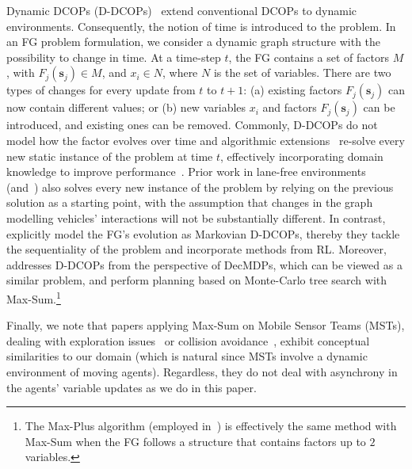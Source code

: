 Dynamic DCOPs (D-DCOPs)~\cite{dcopsurvey} extend conventional DCOPs to dynamic environments. 
Consequently, the notion of time is introduced to the problem. In an FG problem formulation, we consider a dynamic graph structure with the possibility to change in time. 
At a time-step $t$, the FG contains a set of factors $M$, with $F_j(\mathbf{s}_j) \in M$, and $x_i \in N$, where $N$ is the set of variables.
There are two types of changes for every update from $t$ to $t+1$: (a) existing factors $F_j(\mathbf{s}_j)$ can now contain different values; or (b) new variables $x_i$ and factors $F_j(\mathbf{s}_j)$ can be introduced, and existing ones can be removed.
Commonly, D-DCOPs do not model how the factor evolves over time and algorithmic extensions~\cite{dcopsurvey} re-solve every new static instance of the problem at time $t$, effectively incorporating domain knowledge to improve performance~\cite{Ramchurn2010}.
Prior work in lane-free environments~\cite{troullinos_ijcai} (and~\cite{stranders2009}) also solves every new instance of the problem by relying on the previous solution as a starting point, with the assumption that changes in the graph modelling vehicles' interactions will not be substantially different.
In contrast,~\cite{Nguyen_Yeoh_Lau_Zilberstein_Zhang_2014} explicitly model the FG's evolution as Markovian D-DCOPs, thereby they tackle the sequentiality of the problem and incorporate methods from RL.
Moreover,~\cite{scalablemcts} addresses D-DCOPs from the perspective of DecMDPs, which can be viewed as a similar problem, and perform planning based on Monte-Carlo tree search with Max-Sum.\footnote{The Max-Plus algorithm (employed in~\cite{scalablemcts}) is effectively the same method with Max-Sum when the FG follows a structure that contains factors up to $2$ variables.}

Finally, we note that papers applying Max-Sum on Mobile Sensor Teams (MSTs), dealing with exploration issues~\cite{yedidson2018} or collision avoidance~\cite{pertzovsky2024collision}, exhibit conceptual similarities to our domain (which is natural since MSTs involve a dynamic environment of moving agents).
Regardless, they do not deal with asynchrony in the agents' variable updates as we do in this paper.






